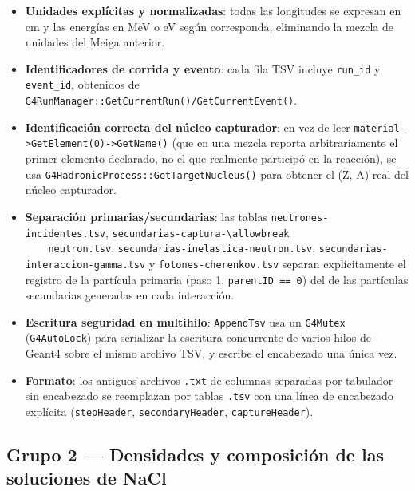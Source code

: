 \documentclass[11pt,a4paper]{article}
\newcommand{\codigo}[1]{\nolinkurl{#1}}
\begin{document}
\begin{itemize}
  \item \textbf{Unidades explícitas y normalizadas}: todas las longitudes
    se expresan en cm y las energías en MeV o eV según corresponda,
    eliminando la mezcla de unidades del Meiga anterior.
  \item \textbf{Identificadores de corrida y evento}: cada fila TSV incluye
    \codigo{run\_id} y \codigo{event\_id}, obtenidos de
    \codigo{G4RunManager::GetCurrentRun()/GetCurrentEvent()}.
  \item \textbf{Identificación correcta del núcleo capturador}: en vez de
    leer \codigo{material->GetElement(0)->GetName()} (que en una mezcla
    reporta arbitrariamente el primer elemento declarado, no el que
    realmente participó en la reacción), se usa
    \codigo{G4HadronicProcess::GetTargetNucleus()} para obtener el
    (Z, A) real del núcleo capturador.
  \item \textbf{Separación primarias/secundarias}: las tablas
    \codigo{neutrones-incidentes.tsv}, \codigo{secundarias-captura-\allowbreak
    neutron.tsv}, \codigo{secundarias-inelastica-neutron.tsv},
    \codigo{secundarias-interaccion-gamma.tsv} y
    \codigo{fotones-cherenkov.tsv} separan explícitamente el registro de
    la partícula primaria (paso 1, \codigo{parentID == 0}) del de las
    partículas secundarias generadas en cada interacción.
  \item \textbf{Escritura seguridad en multihilo}: \codigo{AppendTsv} usa
    un \codigo{G4Mutex} (\codigo{G4AutoLock}) para serializar la escritura
    concurrente de varios hilos de Geant4 sobre el mismo archivo TSV, y
    escribe el encabezado una única vez.
  \item \textbf{Formato}: los antiguos archivos \codigo{.txt} de columnas
    separadas por tabulador sin encabezado se reemplazan por tablas
    \codigo{.tsv} con una línea de encabezado explícita
    (\codigo{stepHeader}, \codigo{secondaryHeader}, \codigo{captureHeader}).
\end{itemize}

\subsection{Grupo 2 --- Densidades y composición de las soluciones de NaCl}
\end{document}
